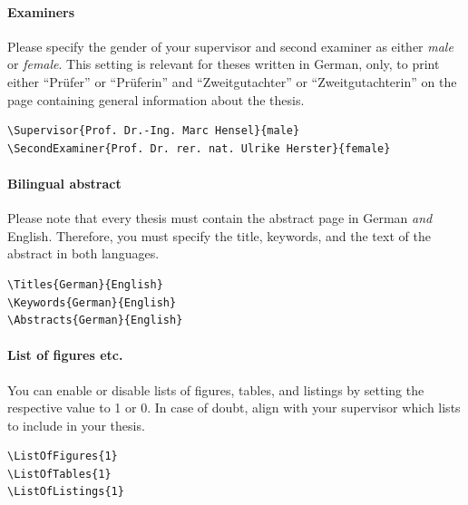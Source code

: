 
\paragraph{Examiners} Please specify the gender of your supervisor and second examiner as either \emph{male} or \emph{female}. This setting is relevant for theses written in German, only, to print either ``Prüfer'' or ``Prüferin'' and ``Zweitgutachter'' or ``Zweitgutachterin'' on the page containing general information about the thesis.
%
\begin{lstlisting}[language=bash]
\Supervisor{Prof. Dr.-Ing. Marc Hensel}{male}
\SecondExaminer{Prof. Dr. rer. nat. Ulrike Herster}{female}
\end{lstlisting}


\paragraph{Bilingual abstract} Please note that every thesis must contain the abstract page in German \emph{and} English. Therefore, you must specify the title, keywords, and the text of the abstract in both languages.
%
\begin{lstlisting}[language=bash]
\Titles{German}{English}
\Keywords{German}{English}
\Abstracts{German}{English}
\end{lstlisting}


\paragraph{List of figures etc.} You can enable or disable lists of figures, tables, and listings by setting the respective value to 1 or 0. In case of doubt, align with your supervisor which lists to include in your thesis.
%
\begin{lstlisting}[language=bash]
\ListOfFigures{1}
\ListOfTables{1}
\ListOfListings{1}
\end{lstlisting}


